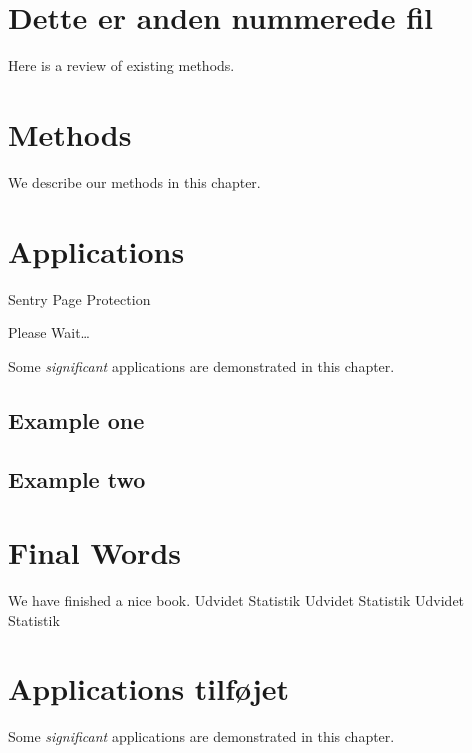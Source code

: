 \documentclass[]{book}
\theoremstyle{definition}
\theoremstyle{definition}
\theoremstyle{definition}
\theoremstyle{remark}
\begin{document}
\hypertarget{dette-er-anden-nummerede-fil}{%
\chapter{Dette er anden nummerede
fil}\label{dette-er-anden-nummerede-fil}}

Here is a review of existing methods.

\hypertarget{methods}{%
\chapter{Methods}\label{methods}}

We describe our methods in this chapter.

\hypertarget{applications}{%
\chapter{Applications}\label{applications}}

\hypertarget{Sentry_noJS}{}
Sentry Page Protection

\hypertarget{Sentry_redirecting}{}
Please Wait\ldots{}

Some \emph{significant} applications are demonstrated in this chapter.

\hypertarget{example-one}{%
\section{Example one}\label{example-one}}

\hypertarget{example-two}{%
\section{Example two}\label{example-two}}

\hypertarget{final-words}{%
\chapter{Final Words}\label{final-words}}

We have finished a nice book. Udvidet Statistik Udvidet Statistik
Udvidet Statistik

\hypertarget{applications-tilfjet}{%
\chapter{Applications tilføjet}\label{applications-tilfjet}}

Some \emph{significant} applications are demonstrated in this chapter.
\end{document}
